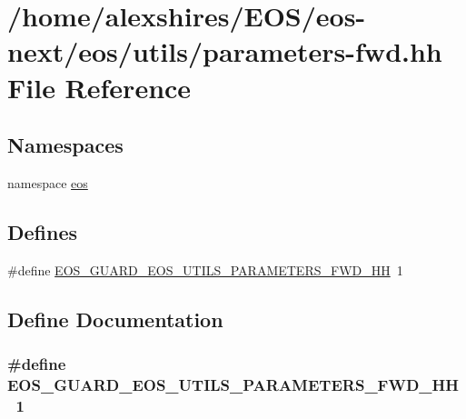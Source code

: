 \hypertarget{parameters-fwd_8hh}{
\section{/home/alexshires/EOS/eos-\/next/eos/utils/parameters-\/fwd.hh File Reference}
\label{parameters-fwd_8hh}
}
\subsection*{Namespaces}
\begin{DoxyCompactItemize}
\item 
namespace \hyperlink{namespaceeos}{eos}
\end{DoxyCompactItemize}
\subsection*{Defines}
\begin{DoxyCompactItemize}
\item 
\#define \hyperlink{parameters-fwd_8hh_a2a2180e38e23a73b3b7a21e3238fa9ef}{EOS\_\-GUARD\_\-EOS\_\-UTILS\_\-PARAMETERS\_\-FWD\_\-HH}~1
\end{DoxyCompactItemize}


\subsection{Define Documentation}
\hypertarget{parameters-fwd_8hh_a2a2180e38e23a73b3b7a21e3238fa9ef}{
\subsubsection[{EOS\_\-GUARD\_\-EOS\_\-UTILS\_\-PARAMETERS\_\-FWD\_\-HH}]{\setlength{\rightskip}{0pt plus 5cm}\#define EOS\_\-GUARD\_\-EOS\_\-UTILS\_\-PARAMETERS\_\-FWD\_\-HH~1}}
\label{parameters-fwd_8hh_a2a2180e38e23a73b3b7a21e3238fa9ef}
